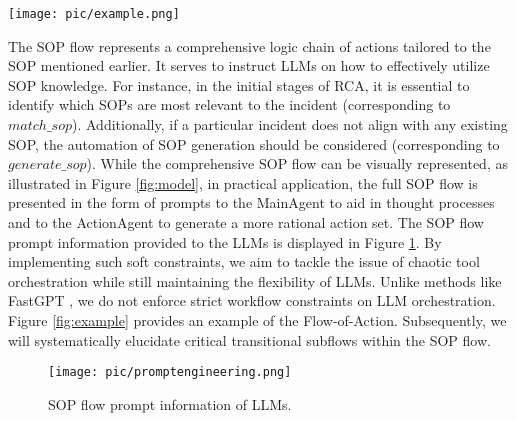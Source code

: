 \begin{figure*}[htbp]
\centerline{\texttt{[image: pic/example.png]}}
\caption{Example of Flow-of-Action.}
\label{fig:example}
\end{figure*}




The SOP flow represents a comprehensive logic chain of actions tailored to the SOP mentioned earlier. It serves to instruct LLMs on how to effectively utilize SOP knowledge. For instance, in the initial stages of RCA, it is essential to identify which SOPs are most relevant to the incident (corresponding to $match\_sop$). Additionally, if a particular incident does not align with any existing SOP, the automation of SOP generation should be considered (corresponding to $generate\_sop$). While the comprehensive SOP flow can be visually represented, as illustrated in Figure \ref{fig:model}, in practical application, the full SOP flow is presented in the form of prompts to the MainAgent to aid in thought processes and to the ActionAgent to generate a more rational action set. The SOP flow prompt information provided to the LLMs is displayed in Figure \ref{fig:promptengineering}. By implementing such soft constraints, we aim to tackle the issue of chaotic tool orchestration while still maintaining the flexibility of LLMs. Unlike methods like FastGPT \citep{fastgpt}, we do not enforce strict workflow constraints on LLM orchestration. Figure \ref{fig:example} provides an example of the Flow-of-Action. Subsequently, we will systematically elucidate critical transitional subflows within the SOP flow.


\begin{figure}[htbp]
\centerline{\texttt{[image: pic/promptengineering.png]}}
\caption{SOP flow prompt information of LLMs.}
\label{fig:promptengineering}
\end{figure}



